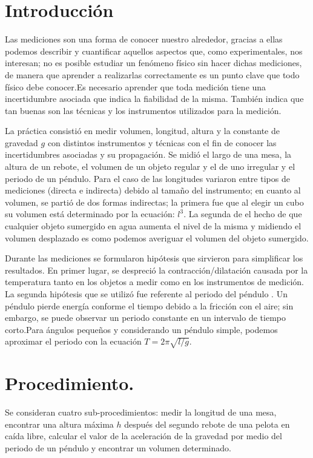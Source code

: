 \documentclass{article}
\begin{document}
\section{Introducción}

Las mediciones son una forma de conocer nuestro alrededor, gracias a ellas podemos describir y cuantificar aquellos aspectos que, como experimentales, nos interesan; no es posible estudiar un fenómeno físico sin hacer dichas mediciones, de manera que aprender a realizarlas correctamente es un punto clave que todo físico debe conocer.Es necesario aprender que toda medición tiene una incertidumbre asociada que indica la fiabilidad de la misma. También indica que tan buenas son las técnicas y los instrumentos utilizados para la medición.

La práctica consistió en medir volumen, longitud, altura y la constante de gravedad $g$ con distintos instrumentos y técnicas con el fin de conocer las incertidumbres asociadas y su propagación. Se midió el largo de una mesa, la altura de un rebote, el volumen de un objeto regular y el de uno irregular y el periodo de un péndulo. Para el caso de las longitudes variaron entre tipos de mediciones (directa e indirecta) debido al tamaño del instrumento; en cuanto al volumen, se partió de dos formas indirectas; la primera fue que al elegir un cubo su volumen está determinado por la ecuación: $l^3$. La segunda de el hecho de que cualquier objeto sumergido en agua aumenta el nivel de la misma y midiendo el volumen desplazado es como podemos averiguar el volumen del objeto sumergido.

Durante las mediciones se formularon hipótesis que sirvieron para simplificar los resultados. En primer lugar, se despreció la contracción/dilatación causada por la temperatura tanto en los objetos a medir como en los instrumentos de medición. La segunda hipótesis que se utilizó fue referente al periodo del péndulo . Un péndulo pierde energía conforme el tiempo debido a la fricción con el aire; sin embargo, se puede observar un periodo constante en un intervalo de tiempo corto.Para ángulos pequeños y considerando un péndulo simple, podemos aproximar el periodo con la ecuación $T = 2\pi \sqrt{l/g}$. 


\section{Procedimiento.}
Se consideran cuatro sub-procedimientos:  medir la longitud de una mesa, encontrar una altura máxima $h$ después del segundo rebote  de una pelota en caída libre, calcular el valor de la aceleración de la gravedad por medio del periodo de un péndulo  y encontrar un volumen determinado. 
\end{document}
